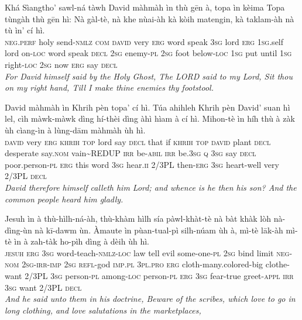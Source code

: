 \documentclass[11pt,a4paper]{article}
\begin{document}
\begin{exe}
\gll Khá Sìangtho' sawl-ná tàwh David màhmàh ìn thù gēn à, topa ìn kèima Topa tùngàh thù gēn hì: Nà gàl-tè, nà khe nùai-àh kà kòih matengin, kà taklam-àh nà tù ìn' cí hì. \\
     \textsc{neg}.\textsc{perf} holy send-\textsc{nmlz} \textsc{com} \textsc{david} very \textsc{erg} word speak \textsc{3sg} lord \textsc{erg} \textsc{1sg}.self lord on-\textsc{loc} word speak \textsc{decl} \textsc{2sg} enemy-\textsc{pl} \textsc{2sg} foot below-\textsc{loc} \textsc{1sg} put until \textsc{1sg} right-\textsc{loc} \textsc{2sg} now \textsc{erg} say \textsc{decl} \\
\glt \textcolor{kjvcolor}{\textit{For David himself said by the Holy Ghost, The LORD said to my Lord, Sit thou on my right hand, Till I make thine enemies thy footstool.}}

\gll David màhmàh ìn Khrih pèn topa' cí hì. Túa ahihleh Khrih pèn David' suan hì lel, cìh màwk-màwk dìng hí-thèi dìng àhì hìam à cí hì. Mihon-tè ìn híh thù à zàk ùh cìang-ìn à lùng-dām màhmàh ùh hì. \\
     \textsc{david} very \textsc{erg} \textsc{khrih} \textsc{top} lord say \textsc{decl} that if \textsc{khrih} \textsc{top} \textsc{david} plant \textsc{decl} desperate say.\textsc{nom} vain\textasciitilde{}REDUP \textsc{irr} be-\textsc{abil} \textsc{irr} be.\textsc{3sg} \textsc{q} \textsc{3sg} say \textsc{decl} poor.person-\textsc{pl} \textsc{erg} this word \textsc{3sg} hear.\textsc{ii} 2/3PL then-\textsc{erg} \textsc{3sg} heart-well very 2/3PL \textsc{decl} \\
\glt \textcolor{kjvcolor}{\textit{David therefore himself calleth him Lord; and whence is he then his son? And the common people heard him gladly.}}

\gll Jesuh ìn à thù-hìlh-ná-àh, thù-khàm hìlh sía pàwl-khàt-tè nà bàt khàk lòh nà-dìng-ùn nà kī-dawm ùn. Àmaute ìn pùan-tual-pì silh-núam ùh à, mì-tè lāk-àh mì-tè ìn à zah-tàk ho-pìh dìng à dèih ùh hì. \\
     \textsc{jesuh} \textsc{erg} \textsc{3sg} word-teach-\textsc{nmlz}-\textsc{loc} law tell evil some-one-\textsc{pl} \textsc{2sg} bind limit \textsc{neg}-\textsc{nom} \textsc{2sg}-\textsc{irr}-\textsc{imp} \textsc{2sg} \textsc{refl}-god \textsc{imp}.\textsc{pl} \textsc{3pl}.\textsc{pro} \textsc{erg} cloth-many.colored-big clothe-want 2/3PL \textsc{3sg} person-\textsc{pl} among-\textsc{loc} person-\textsc{pl} \textsc{erg} \textsc{3sg} fear-true greet-\textsc{appl} \textsc{irr} \textsc{3sg} want 2/3PL \textsc{decl} \\
\glt \textcolor{kjvcolor}{\textit{And he said unto them in his doctrine, Beware of the scribes, which love to go in long clothing, and love salutations in the marketplaces,}}


\end{exe}
\end{document}
